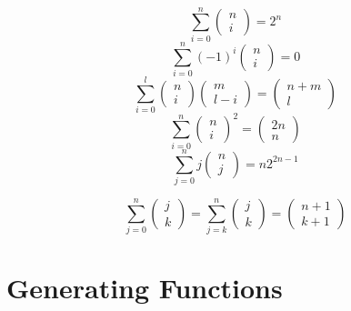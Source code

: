 \documentclass[12pt]{article}
\begin{document}
	\begin{tcolorbox}
	\\
	\hfill
	$$ \sum_{i=0}^n  \begin{pmatrix} n \\ i \end{pmatrix}  = 2^n$$
	$$ \sum_{i=0}^n (-1)^i  \begin{pmatrix} n \\ i \end{pmatrix}  = 0$$
	$$ \sum_{i=0}^l \begin{pmatrix} n \\ i \end{pmatrix} \begin{pmatrix} m \\ l-i \end{pmatrix} = \begin{pmatrix} n+m \\ l \end{pmatrix} $$
	$$  \sum_{i=0}^n   \begin{pmatrix} n \\ i \end{pmatrix} ^2 =    \begin{pmatrix} 2n \\ n \end{pmatrix}  $$
	$$  \sum_{j=0}^n  j \begin{pmatrix} n \\ j \end{pmatrix}  = n2^{2n-1}$$
	
	$$ \sum_{j=0}^n   \begin{pmatrix} j \\ k \end{pmatrix}  = \sum_{j=k}^n   \begin{pmatrix} j \\ k \end{pmatrix}  =  \begin{pmatrix} n+1 \\ k+1 \end{pmatrix}$$  

	\end{tcolorbox}

\newpage
\section{Generating Functions}
\begin{center} \end{center}
\vspace{-1em}
	
\end{document}
